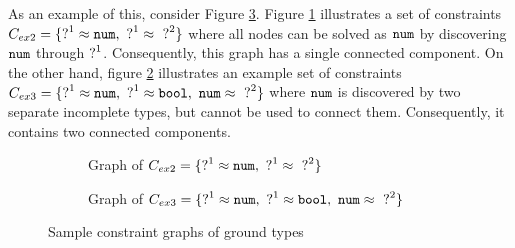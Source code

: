 As an example of this, consider Figure \ref{fig:ex2ex3graphs}. Figure \ref{fig:reachable-tag} illustrates a set of constraints $C_{ex2} = \{ \mathtt{?}^{1} \approx \mathtt{num}, ~ \mathtt{?}^{1} \approx~ \mathtt{?}^{2}\}$ where all nodes can be solved as $\mathtt{num}$ by discovering $\mathtt{num}$ through $\mathtt{?}^1$. Consequently, this graph has a single connected component. On the other hand, figure  \ref{fig:disjoint-nodes} illustrates an example set of constraints $C_{ex3} = \{ \mathtt{?}^1 \approx \mathtt{num}, ~ \mathtt{?}^1 \approx \mathtt{bool}, ~ \mathtt{num} \approx~ \mathtt{?}^2\}$ where $\mathtt{num}$ is discovered by two separate incomplete types, but cannot be used to connect them. Consequently, it contains two connected components. 

\begin{figure}[htb!]
\centering
\begin{subfigure}{.49\textwidth}
  \centering
  \caption{Graph of $C_{ex2} = \{ \mathtt{?}^{1} \approx \mathtt{num}, ~ \mathtt{?}^{1} \approx~ \mathtt{?}^{2}\}$}
  \label{fig:reachable-tag}
\end{subfigure}
\begin{subfigure}{.49\textwidth}
  \centering
  \caption{Graph of $C_{ex3} = \{ \mathtt{?}^1 \approx \mathtt{num}, ~ \mathtt{?}^1 \approx \mathtt{bool}, ~ \mathtt{num} \approx~ \mathtt{?}^2\}$}
  \label{fig:disjoint-nodes}
\end{subfigure}
\caption{Sample constraint graphs of ground types}
\label{fig:ex2ex3graphs}
\end{figure}

